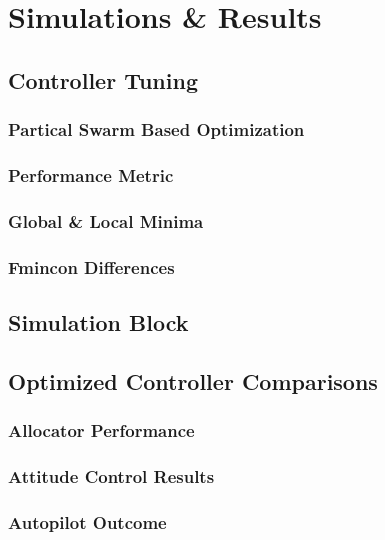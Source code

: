 \chapter{Simulations \& Results}
\label{ch:ch5}
\section{Controller Tuning}
\subsection{Partical Swarm Based Optimization}
\subsection{Performance Metric}
\subsection{Global \& Local Minima}
\subsection{Fmincon Differences}
\section{Simulation Block}

\section{Optimized Controller Comparisons}
\subsection{Allocator Performance}
\subsection{Attitude Control Results}
\subsection{Autopilot Outcome}
